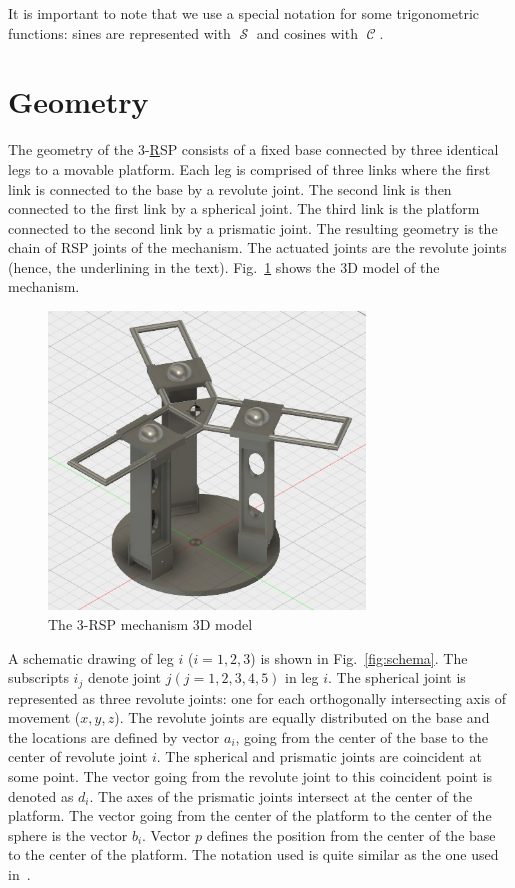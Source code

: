 \documentclass[titlepage, letterpaper]{article}
\DeclareMathOperator{\cose}{\mathcal{C}}
\DeclareMathOperator{\sen}{\mathcal{S}}
\begin{document}
It is important to note that we use a special notation for some trigonometric functions: sines are represented with $\sen$ and cosines with $\cose$.

\section{Geometry}
\label{sec:geo}

The geometry of the 3-\underline{R}SP consists of a fixed base connected by three identical legs to a movable platform.
Each leg is comprised of three links where the first link is connected to the base by a revolute joint.
The second link is then connected to the first link by a spherical joint.
The third link is the platform connected to the second link by a prismatic joint.
The resulting geometry is the chain of RSP joints of the mechanism.
The actuated joints are the revolute joints (hence, the underlining in the text).
Fig.~\ref{fig:3dmodel} shows the 3D model of the mechanism.

\begin{figure}[htbp]
    \centering
    \includegraphics[width=0.75\textwidth]{fig_3dmodel}
    \caption{The 3-RSP mechanism 3D model}
    \label{fig:3dmodel}
\end{figure}

A schematic drawing of leg $i$ ($i = 1, 2, 3$) is shown in Fig.~\ref{fig:schema}.
The subscripts $i_j$ denote joint $j ( j = 1, 2, 3, 4, 5)$ in leg $i$.
The spherical joint is represented as three revolute joints:
one for each orthogonally intersecting axis of movement ($x, y, z$).
The revolute joints are equally distributed on the base and the locations are defined by vector $a_i$, going from the center of the base to the center of revolute joint $i$.
The spherical and prismatic joints are coincident at some point. The vector going from the revolute joint to this coincident point is denoted as $d_i$.
The axes of the prismatic joints intersect at the center of the platform.
The vector going from the center of the platform to the center of the sphere is the vector $b_i$.
Vector $p$ defines the position from the center of the base to the center of the platform.
The notation used is quite similar as the one used in~\cite{Rodriguez-Leal11}.
\end{document}
